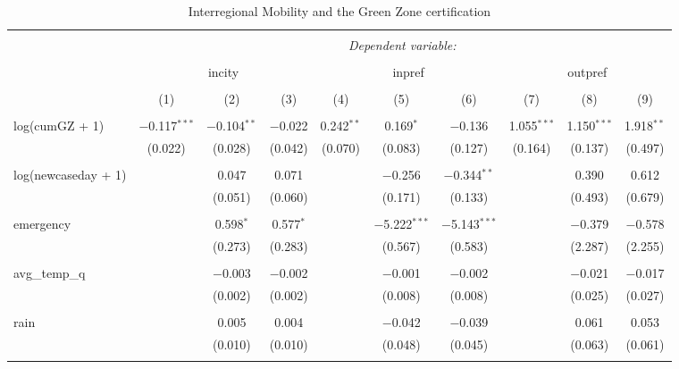 
\begin{table}[!htbp] \centering 
  \caption{Interregional Mobility and the Green Zone certification} 
  \label{} 
\begin{tabular}{@{\extracolsep{5pt}}lccccccccc} 
\\[-1.8ex]\hline 
\hline \\[-1.8ex] 
 & \multicolumn{9}{c}{\textit{Dependent variable:}} \\ 
\cline{2-10} 
\\[-1.8ex] & \multicolumn{3}{c}{incity} & \multicolumn{3}{c}{inpref} & \multicolumn{3}{c}{outpref} \\ 
\\[-1.8ex] & (1) & (2) & (3) & (4) & (5) & (6) & (7) & (8) & (9)\\ 
\hline \\[-1.8ex] 
 log(cumGZ + 1) & $-$0.117$^{***}$ & $-$0.104$^{**}$ & $-$0.022 & 0.242$^{**}$ & 0.169$^{*}$ & $-$0.136 & 1.055$^{***}$ & 1.150$^{***}$ & 1.918$^{**}$ \\ 
  & (0.022) & (0.028) & (0.042) & (0.070) & (0.083) & (0.127) & (0.164) & (0.137) & (0.497) \\ 
  & & & & & & & & & \\ 
 log(newcaseday + 1) &  & 0.047 & 0.071 &  & $-$0.256 & $-$0.344$^{**}$ &  & 0.390 & 0.612 \\ 
  &  & (0.051) & (0.060) &  & (0.171) & (0.133) &  & (0.493) & (0.679) \\ 
  & & & & & & & & & \\ 
 emergency &  & 0.598$^{*}$ & 0.577$^{*}$ &  & $-$5.222$^{***}$ & $-$5.143$^{***}$ &  & $-$0.379 & $-$0.578 \\ 
  &  & (0.273) & (0.283) &  & (0.567) & (0.583) &  & (2.287) & (2.255) \\ 
  & & & & & & & & & \\ 
 avg\_temp\_q &  & $-$0.003 & $-$0.002 &  & $-$0.001 & $-$0.002 &  & $-$0.021 & $-$0.017 \\ 
  &  & (0.002) & (0.002) &  & (0.008) & (0.008) &  & (0.025) & (0.027) \\ 
  & & & & & & & & & \\ 
 rain &  & 0.005 & 0.004 &  & $-$0.042 & $-$0.039 &  & 0.061 & 0.053 \\ 
  &  & (0.010) & (0.010) &  & (0.048) & (0.045) &  & (0.063) & (0.061) \\ 
  & & & & & & & & & \\ 

\end{tabular}
\end{table}
